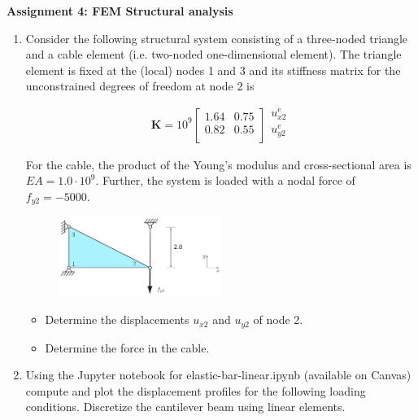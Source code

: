 \documentclass[a4paper,12pt]{article}
\begin{document}
\begin{centering}
	\textbf{
		Assignment 4: FEM Structural analysis
	}
\end{centering}

\vspace{1em}
 
\begin{enumerate}

	\item Consider the following structural system consisting of a three-noded triangle and a cable
	element (i.e. two-noded one-dimensional element). The triangle element is fixed at the (local) nodes 1 and 3 and its stiffness matrix for the unconstrained degrees of freedom at node 2 is
	
		\begin{equation*}
			\mathbf{K} = 10^9 %
			\begin{bmatrix}
				1.64	& 0.75 \\ 
				0.82 & 0.55 \\
			\end{bmatrix}
			\begin{matrix}
				u_{x2}^e\\ 
				u_{y2}^e \\
			\end{matrix}	
		\end{equation*}
		
		For the cable, the product of the Young’s modulus and cross-sectional area is $EA = 1.0\cdot 10^9$.
		Further, the system is loaded with a nodal force of $f_{y2} = -5000$.
		
		\begin{figure}[!h]
			\centering
			\includegraphics[width=0.5\textwidth]{figs/2d-truss.png}
		\end{figure}
	
		\begin{itemize}
			\item Determine the displacements $u_{x2}$ and $u_{y2}$ of node 2.
			\item Determine the force in the cable.
		\end{itemize}
	
	
	\item Using the Jupyter notebook for elastic-bar-linear.ipynb (available on Canvas) compute and plot the displacement profiles for the following loading conditions. Discretize the cantilever beam using linear elements.
	

\end{enumerate}
\end{document}

